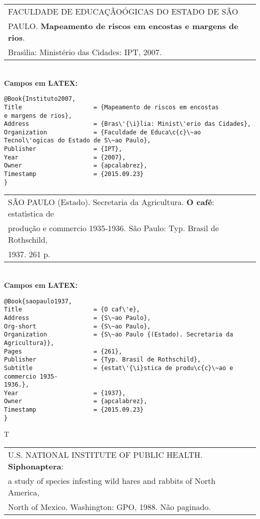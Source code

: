 \begin{tabular}{|l|c|} \hline
	FACULDADE DE EDUCA\c{C}\~AO\'OGICAS DO ESTADO DE S\~AO \\
	PAULO.  \textbf{Mapeamento de riscos em encostas e margens de rios}. \\ 
	Bras\'{\i}lia: Minist\'erio das Cidades: IPT, 2007.   \\\hline
\end{tabular}\\

\textbf{Campos em LATEX:}

\begin{verbatim}
@Book{Instituto2007,
Title                    = {Mapeamento de riscos em encostas
e margens de rios},
Address                  = {Bras\'{\i}lia: Minist\'erio das Cidades},
Organization             = {Faculdade de Educa\c{c}\~ao
Tecnol\'ogicas do Estado de S\~ao Paulo},
Publisher                = {IPT},
Year                     = {2007},
Owner                    = {apcalabrez},
Timestamp                = {2015.09.23}
}
\end{verbatim}

\begin{tabular}{|l|c|} \hline
	S\~AO PAULO (Estado). Secretaria da Agricultura. \textbf{O caf\'e}: estat\'{\i}stica de \\produ\c{c}\~ao e commercio 1935-1936. S\~ao Paulo: Typ. Brasil de Rothschild, \\1937. 261 p.  \\\hline
\end{tabular}\\

\textbf{Campos em LATEX:}

\begin{verbatim}
@Book{saopaulo1937,
Title                    = {O caf\'e},
Address                  = {S\~ao Paulo},
Org-short                = {S\~ao Paulo},
Organization             = {S\~ao Paulo {(Estado). Secretaria da 
Agricultura}},
Pages                    = {261},
Publisher                = {Typ. Brasil de Rothschild},
Subtitle                 = {estat\'{\i}stica de produ\c{c}\~ao e commercio 1935-
1936.},
Year                     = {1937},
Owner                    = {apcalabrez},
Timestamp                = {2015.09.23}
}
\end{verbatim}
T

\begin{tabular}{|l|c|} \hline
	U.S. NATIONAL INSTITUTE OF PUBLIC HEALTH. \textbf{Siphonaptera}: \\  a study
	of species infesting wild hares and rabbits of North America,\\ North of Mexico. Washington: GPO, 1988. N\~ao paginado.  \\\hline
\end{tabular}\\

